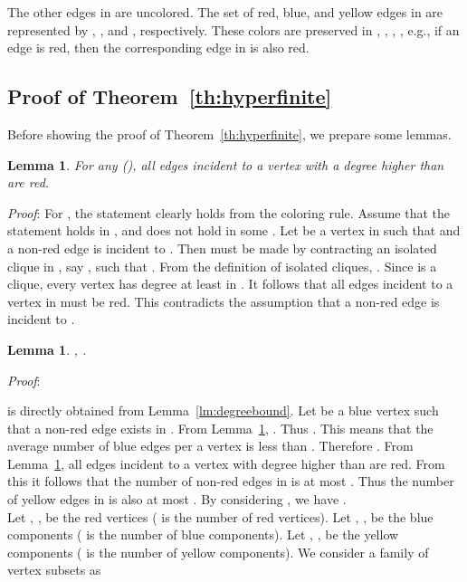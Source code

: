 \documentclass[11pt]{article}
\newtheorem{lm}[thm]{Lemma}
\newcommand{\qed}{\hspace*{\fill} }
\begin{document}
The other edges in  are uncolored. 
The set of red, blue, and yellow edges in  
are represented by , , and , respectively. 
These colors are preserved in 
, , , , 
e.g., if an edge  is red, then the corresponding edge in  is also red. 



\subsection{Proof of Theorem~\ref{th:hyperfinite}}

Before showing the proof of Theorem~\ref{th:hyperfinite}, we prepare some lemmas. 


\begin{lm}\label{lm:high_degree_is_red}
For any  (), 
all edges incident to a vertex with a degree higher than  are red.  
\end{lm}


\noindent
{\em Proof}: 
For , the statement clearly holds from the coloring rule. 
Assume that the statement holds in , and 
does not hold in some . 
Let  be a vertex in  such that  
and a non-red edge is incident to . 
Then  must be made by contracting an 
isolated clique  in , say ,  
such that . 
From the definition of isolated cliques, 
. 
Since  is a clique, every vertex  
has degree at least  in . 
It follows that all edges incident to a vertex in  must be red. 
This contradicts the assumption that a non-red edge is incident to . \qed



\begin{lm}\label{lm:number_of_colored_edges}
, .
\end{lm}




\noindent
{\em Proof}: 
 
is directly obtained from 
Lemma~\ref{lm:degreebound}. 
Let  be a blue vertex 
such that a non-red edge exists in . 
From Lemma~\ref{lm:high_degree_is_red}, 
. 
Thus . 
This means that the average number of blue edges per a vertex is 
less than  . 
Therefore . 
From Lemma~\ref{lm:high_degree_is_red}, 
all edges incident to a vertex with degree higher than  
are red. 
From this it follows that  
the number of non-red edges in  is at most  
. 
Thus the number of yellow edges in  is also at most  . 
By considering , 
we have 
. \qed\\


Let , ,  be the red vertices 
( is the number of red vertices).
Let , ,  be the blue components 
( is the number of blue components). 
Let , ,  be the yellow components 
( is the number of yellow components). 
We consider a family of vertex subsets as 
\end{document}
